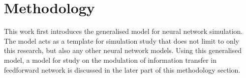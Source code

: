 \chapter{Methodology}
This work first introduces the generalised model for neural network simulation. The model acts as a template for simulation study that does not limit to only this research, but also any other neural network models. Using this generalised model, a model for study on the modulation of information transfer in feedforward network is discussed in the later part of this methodology section. 
